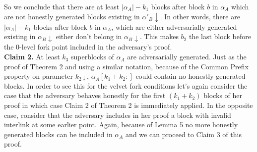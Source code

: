 So we conclude that there are at least $\vert \alpha_A \vert - k_1$ blocks after block $b$ in $\alpha_A$ which are not honestly generated blocks existing in $\alpha'_B\downarrow$. In other words, there are $\vert \alpha_A \vert - k_1$ blocks after block $b$ in $\alpha_A$, which are either adversarially generated existing in $\alpha_B\downarrow$ either don't belong in $\alpha_B\downarrow$. This makes $b_2$ the last block before the 0-level fork point included in the adversary's proof.\\

\textbf{Claim 2.} 
At least $k_3$ superblocks of $\alpha_A$ are adversarially generated. Just as the proof of Theorem 2 and using a similar notation, because of the Common Prefix property on parameter $k_{2\downarrow}$, $\alpha_A[k_{1}+k_{2}:]$ could contain no honestly generated blocks. In order to see this for the velvet fork conditions let's again consider the case that the adversary behaves honestly for the first $(k_1 + k_2)$ blocks of her proof in which case Claim 2 of Theorem 2 is immediately applied. In the opposite case, consider that the adversary includes in her proof a block with invalid interlink at some earlier point. Again, because of Lemma 5 no more honestly generated blocks can be included in $\alpha_A$ and we can proceed to Claim 3 of this proof.\\


